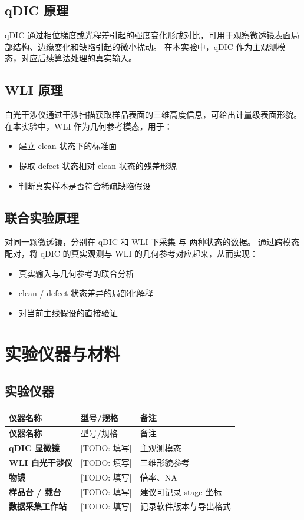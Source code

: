 \documentclass[UTF8,a4paper,11pt]{ctexart}
\newcommand{\Code}[1]{\texttt{\detokenize{#1}}}
\newcommand{\TODO}[1]{\textcolor{red!70!black}{[TODO: #1]}}
\begin{document}
\subsection{qDIC 原理}

qDIC 通过相位梯度或光程差引起的强度变化形成对比，可用于观察微透镜表面局部结构、边缘变化和缺陷引起的微小扰动。
在本实验中，qDIC 作为主观测模态，对应后续算法处理的真实输入。

\subsection{WLI 原理}

白光干涉仪通过干涉扫描获取样品表面的三维高度信息，可给出计量级表面形貌。
在本实验中，WLI 作为几何参考模态，用于：
\begin{itemize}
  \item 建立 clean 状态下的标准面
  \item 提取 defect 状态相对 clean 状态的残差形貌
  \item 判断真实样本是否符合稀疏缺陷假设
\end{itemize}

\subsection{联合实验原理}

对同一颗微透镜，分别在 qDIC 和 WLI 下采集 \Code{clean} 与 \Code{defect} 两种状态的数据。
通过跨模态配对，将 qDIC 的真实观测与 WLI 的几何参考对应起来，从而实现：
\begin{itemize}
  \item 真实输入与几何参考的联合分析
  \item clean / defect 状态差异的局部化解释
  \item 对当前主线假设的直接验证
\end{itemize}

\section{实验仪器与材料}

\subsection{实验仪器}

\begin{longtable}{>{\bfseries}p{} p{} p{}}
\toprule
仪器名称 & 型号/规格 & 备注 \\
\midrule
\endfirsthead
\toprule
仪器名称 & 型号/规格 & 备注 \\
\midrule
\endhead
qDIC 显微镜 & \TODO{填写} & 主观测模态 \\
WLI 白光干涉仪 & \TODO{填写} & 三维形貌参考 \\
物镜 & \TODO{填写} & 倍率、NA \\
样品台 / 载台 & \TODO{填写} & 建议可记录 stage 坐标 \\
数据采集工作站 & \TODO{填写} & 记录软件版本与导出格式 \\
\bottomrule
\end{longtable}
\end{document}
